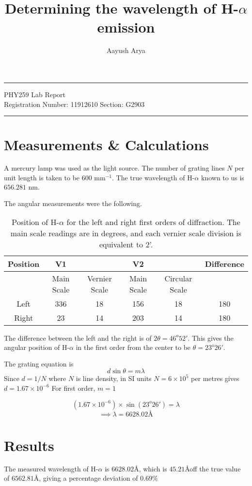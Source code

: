 \documentclass[11pt, a4paper]{article}
\begin{document}
	\author{Aayush Arya}
	\title{Determining the wavelength of H-$\alpha$ emission}
	\maketitle
	
	\hrule
	\begin{center}
		PHY259 Lab Report\\
		Registration Number: 11912610 \quad Section: G2903
	\end{center}
	\hrule
	
	\section*{Measurements \& Calculations}
	
	A mercury lamp was used as the light source. The number of grating lines $N$ per unit length is taken to be $600$ mm$^{-1}$. The true wavelength of H-$\alpha$ known to us is $656.281$ nm.
	
	
	The angular measurements were the following.
	
	\begin{table}[h]
		\centering
		\begin{tabular}{|c||c|c|c|c|c|}
			\hline
			Position & V1 & & V2 & & Difference \\
			\hline
			& Main Scale & Vernier Scale & Main Scale & Circular Scale & \\
			\hline
			Left & 336 & 18 & 156& 18 & 180 \\
			Right & 23 & 14 & 203 & 14 & 180 \\
			\hline
		\end{tabular}
		\caption{Position of H-$\alpha$ for the left and right first orders of diffraction. The main scale readings are in degrees, and each vernier scale division is equivalent to 2'.}
	\end{table}
	
	The difference between the left and the right is of $2\theta = 46^o52'$. This gives the angular position of H-$\alpha$ in the first order from the center to be $\theta = 23^o26'$.
	
	The grating equation is $$ d\sin \theta = m\lambda$$
	Since $d = 1/N$ where $N$ is line density, in SI units $N=6\times10^5$ per metres gives $d = 1.67 \times 10^{-6}$ For first order, $m=1$
	
	$$ (1.67 \times 10^{-6})\times \sin (23^o26')= \lambda$$
	$$ \implies \lambda = 6628.02 \text{\AA}$$
	\section*{Results}
	The measured wavelength of H-$\alpha$ is $6628.02$\AA, which is $45.21$\AA off the true value of $6562.81$\AA, giving a percentage deviation of $0.69\%$ 
	
\end{document}
